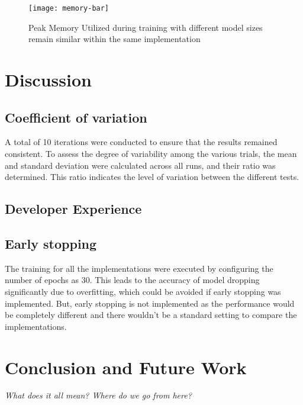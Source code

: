 \begin{figure}[ht]
	\centering
	\texttt{[image: memory-bar]}
	\caption[Peak Memory Utilisation]{Peak Memory Utilized during training with different model sizes remain similar within the same implementation}
\end{figure}

\chapter{Discussion}

\section{Coefficient of variation}
A total of 10 iterations were conducted to ensure that the results remained consistent. To assess the degree of variability among the various trials, the mean and standard deviation were calculated across all runs, and their ratio was determined. This ratio indicates the level of variation between the different tests.

\section{Developer Experience}

\section{Early stopping}
The training for all the implementations were executed by configuring the number of epochs as 30. This leads to the accuracy of model dropping significantly due to overfitting, which could be avoided if early stopping was implemented.
But, early stopping is not implemented as the performance would be completely different and there wouldn't be a standard setting to compare the implementations.

\chapter{Conclusion and Future Work}
\textit{What does it all mean? Where do we go from here?}
